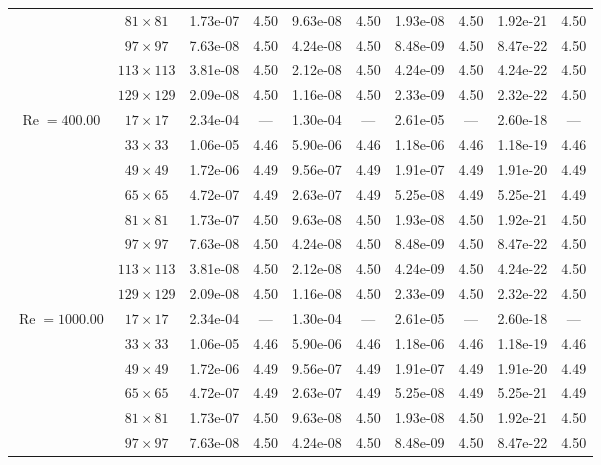 \documentclass[preprint, 12pt]{elsarticle}
\begin{document}
\begin{center}
\begin{table}[H]
{\begin{tabular*}{\textwidth}{@{\extracolsep\fill}cccccccccc@{}}
    & $81\times 81$ & 1.73e-07 & 4.50 & 9.63e-08 & 4.50 & 1.93e-08 & 4.50 & 1.92e-21 & 4.50 \\
    & $97\times 97$ & 7.63e-08 & 4.50 & 4.24e-08 & 4.50 & 8.48e-09 & 4.50 & 8.47e-22 & 4.50 \\
    & $113\times 113$ & 3.81e-08 & 4.50 & 2.12e-08 & 4.50 & 4.24e-09 & 4.50 & 4.24e-22 & 4.50 \\
    & $129\times 129$ & 2.09e-08 & 4.50 & 1.16e-08 & 4.50 & 2.33e-09 & 4.50 & 2.32e-22 & 4.50 \\
    \hline
    \multirow{7}{*}{$\operatorname{Re}=400.00$} & $17\times 17$ & 2.34e-04 & --- & 1.30e-04 & --- & 2.61e-05 & --- & 2.60e-18 & --- \\
    & $33\times 33$ & 1.06e-05 & 4.46 & 5.90e-06 & 4.46 & 1.18e-06 & 4.46 & 1.18e-19 & 4.46 \\
    & $49\times 49$ & 1.72e-06 & 4.49 & 9.56e-07 & 4.49 & 1.91e-07 & 4.49 & 1.91e-20 & 4.49 \\
    \multirow{3}{*}{$\operatorname{Wi}=5$} & $65\times 65$ & 4.72e-07 & 4.49 & 2.63e-07 & 4.49 & 5.25e-08 & 4.49 & 5.25e-21 & 4.49 \\
    & $81\times 81$ & 1.73e-07 & 4.50 & 9.63e-08 & 4.50 & 1.93e-08 & 4.50 & 1.92e-21 & 4.50 \\
    & $97\times 97$ & 7.63e-08 & 4.50 & 4.24e-08 & 4.50 & 8.48e-09 & 4.50 & 8.47e-22 & 4.50 \\
    & $113\times 113$ & 3.81e-08 & 4.50 & 2.12e-08 & 4.50 & 4.24e-09 & 4.50 & 4.24e-22 & 4.50 \\
    & $129\times 129$ & 2.09e-08 & 4.50 & 1.16e-08 & 4.50 & 2.33e-09 & 4.50 & 2.32e-22 & 4.50 \\
    \hline
    \multirow{7}{*}{$\operatorname{Re}=1000.00$} & $17\times 17$ & 2.34e-04 & --- & 1.30e-04 & --- & 2.61e-05 & --- & 2.60e-18 & --- \\
    & $33\times 33$ & 1.06e-05 & 4.46 & 5.90e-06 & 4.46 & 1.18e-06 & 4.46 & 1.18e-19 & 4.46 \\
    & $49\times 49$ & 1.72e-06 & 4.49 & 9.56e-07 & 4.49 & 1.91e-07 & 4.49 & 1.91e-20 & 4.49 \\
    \multirow{3}{*}{$\operatorname{Wi}=5$} & $65\times 65$ & 4.72e-07 & 4.49 & 2.63e-07 & 4.49 & 5.25e-08 & 4.49 & 5.25e-21 & 4.49 \\
    & $81\times 81$ & 1.73e-07 & 4.50 & 9.63e-08 & 4.50 & 1.93e-08 & 4.50 & 1.92e-21 & 4.50 \\
    & $97\times 97$ & 7.63e-08 & 4.50 & 4.24e-08 & 4.50 & 8.48e-09 & 4.50 & 8.47e-22 & 4.50 \\

\end{tabular*}}
\end{table}
\end{center}
\end{document}
